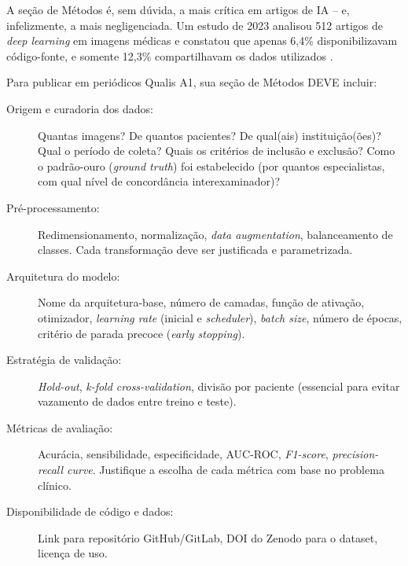 A seção de Métodos é, sem dúvida, a mais crítica em artigos de IA -- e,
infelizmente, a mais negligenciada. Um estudo de 2023 analisou 512 artigos de
\textit{deep learning} em imagens médicas e constatou que apenas 6,4\%
disponibilizavam código-fonte, e somente 12,3\% compartilhavam os dados
utilizados \cite{roberts2021common}.


Para publicar em periódicos Qualis A1, sua seção de Métodos DEVE incluir:

\begin{description}
  \item[Origem e curadoria dos dados:] Quantas imagens? De quantos pacientes?
    De qual(ais) instituição(ões)? Qual o período de coleta? Quais os critérios
    de inclusão e exclusão? Como o padrão-ouro (\textit{ground truth}) foi
    estabelecido (por quantos especialistas, com qual nível de concordância
    interexaminador)?

  \item[Pré-processamento:] Redimensionamento, normalização, \textit{data
    augmentation}, balanceamento de classes. Cada transformação deve ser
    justificada e parametrizada.

  \item[Arquitetura do modelo:] Nome da arquitetura-base, número de camadas,
    função de ativação, otimizador, \textit{learning rate} (inicial e
    \textit{scheduler}), \textit{batch size}, número de épocas, critério de
    parada precoce (\textit{early stopping}).

  \item[Estratégia de validação:] \textit{Hold-out}, \textit{k-fold
    cross-validation}, divisão por paciente (essencial para evitar vazamento de
    dados entre treino e teste).

  \item[Métricas de avaliação:] Acurácia, sensibilidade, especificidade, AUC-ROC,
    \textit{F1-score}, \textit{precision-recall curve}. Justifique a escolha de
    cada métrica com base no problema clínico.

  \item[Disponibilidade de código e dados:] Link para repositório GitHub/GitLab,
    DOI do Zenodo para o dataset, licença de uso.
\end{description}


